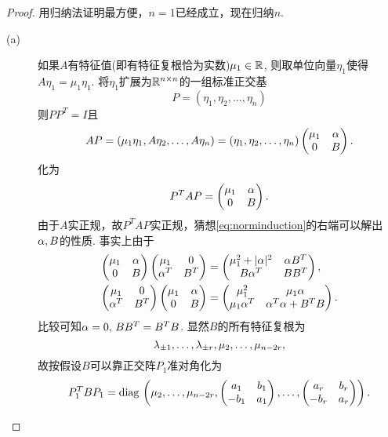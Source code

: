 \begin{proof}
	用归纳法证明最方便，$n=1$已经成立，现在归纳$n$. 
	\begin{description}
		\item[(a)] 如果$A$有特征值(即有特征复根恰为实数)$\mu_1\in\mathbb{R}$, 则取单位向量$\eta_1$使得$A\eta_1=\mu_1 \eta_1$. 将$\eta_1$扩展为$\mathbb{R}^{n\times n}$的一组标准正交基
		\[P=(\eta_1,\eta_2,\dots,\eta_n)\]
		则$PP^T=I$且
		\[AP=(\mu_1\eta_1,A\eta_2,\dots,A\eta_n)=(\eta_1,\eta_2,\dots,\eta_n)
		\begin{pmatrix} \mu_1 & \alpha\\ 0 & B\end{pmatrix}.\]
		化为
		\begin{equation}\label{eq:norminduction}
		P^T AP=\begin{pmatrix} \mu_1 & \alpha\\ 0 & B\end{pmatrix}.
		\end{equation}
		由于$A$实正规，故$P^T AP$实正规，猜想\eqref{eq:norminduction}的右端可以解出$\alpha,B$的性质.
		事实上由于
		\begin{align*}
		\begin{pmatrix} \mu_1 & \alpha\\ 0 & B\end{pmatrix}
		\begin{pmatrix} \mu_1 & 0\\ \alpha^T & B^T\end{pmatrix}&=
			\begin{pmatrix} \mu_1^2+|\alpha|^2 & \alpha B^T\\ B\alpha^T & BB^T\end{pmatrix},\\
		\begin{pmatrix} \mu_1 & 0\\ \alpha^T & B^T\end{pmatrix}
		\begin{pmatrix} \mu_1 & \alpha\\ 0 & B\end{pmatrix}&=
		\begin{pmatrix} \mu_1^2 & \mu_1\alpha\\ \mu_1\alpha^T & \alpha^T\alpha+B^T B\end{pmatrix}.
		\end{align*}
		比较可知$\alpha=0,\, BB^T=B^TB$. 显然$B$的所有特征复根为
		\[\lambda_{\pm 1},\dots,\lambda_{\pm r},\mu_2,\dots,\mu_{n-2r},\]
		故按假设$B$可以靠正交阵$P_1$准对角化为
		\[P_1^T B P_1=\operatorname*{diag\,}\left(\mu_2,\dots,\mu_{n-2r},
		\begin{pmatrix} a_1 & b_1\\ -b_1 & a_1\end{pmatrix},\dots,\begin{pmatrix} a_r & b_r\\ -b_r & a_r\end{pmatrix}\right).\]

\end{description}
\end{proof}
